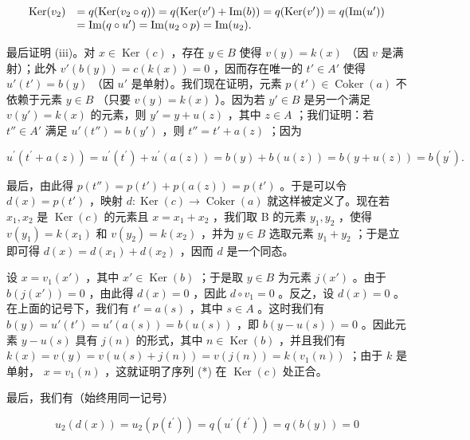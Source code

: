 \[
\begin{array}{r l} \operatorname{Ker} (v _ {2}) & = q (\operatorname{Ker} (v _ {2} \circ q)) = q (\operatorname{Ker} (v ^ {\prime}) + \operatorname{Im} (b)) = q (\operatorname{Ker} (v ^ {\prime})) = q (\operatorname{Im} (u ^ {\prime})) \\ & = \operatorname{Im} (q \circ u ^ {\prime}) = \operatorname{Im} (u _ {2} \circ p) = \operatorname{Im} (u _ {2}). \end{array}
\]

最后证明 (iii)。对 \(x \in \operatorname{Ker}(c)\) ，存在 \(y \in B\) 使得 \(v(y) = k(x)\) （因 \(v\) 是满射）；此外 \(v'(b(y)) = c(k(x)) = 0\) ，因而存在唯一的 \(t' \in A'\) 使得 \(u'(t') = b(y)\) （因 \(u'\) 是单射）。我们现在证明，元素 \(p(t') \in \operatorname{Coker}(a)\) 不依赖于元素 \(y \in B\) （只要 \(v(y) = k(x)\) ）。因为若 \(y' \in B\) 是另一个满足 \(v(y') = k(x)\) 的元素，则 \(y' = y + u(z)\) ，其中 \(z \in A\) ；我们证明：若 \(t'' \in A'\) 满足 \(u'(t'') = b(y')\) ，则 \(t'' = t' + a(z)\) ；因为

\[
u ^ {\prime} \left(t ^ {\prime} + a (z)\right) = u ^ {\prime} \left(t ^ {\prime}\right) + u ^ {\prime} (a (z)) = b (y) + b (u (z)) = b (y + u (z)) = b \left(y ^ {\prime}\right).
\]

最后，由此得 \(p(t'') = p(t') + p(a(z)) = p(t')\) 。于是可以令 \(d(x) = p(t')\) ，映射 \(d: \operatorname{Ker}(c) \to \operatorname{Coker}(a)\) 就这样被定义了。现在若 \(x_1, x_2\) 是 \(\operatorname{Ker}(c)\) 的元素且 \(x = x_1 + x_2\) ，我们取 B 的元素 \(y_1, y_2\) ，使得 \(v(y_1) = k(x_1)\) 和 \(v(y_2) = k(x_2)\) ，并为 \(y \in B\) 选取元素 \(y_1 + y_2\) ；于是立即可得 \(d(x) = d(x_1) + d(x_2)\) ，因而 \(d\) 是一个同态。

设 \(x = v_{1}(x')\) ，其中 \(x' \in \operatorname{Ker}(b)\) ；于是取 \(y \in B\) 为元素 \(j(x')\) 。由于 \(b(j(x')) = 0\) ，由此得 \(d(x) = 0\) ，因此 \(d \circ v_{1} = 0\) 。反之，设 \(d(x) = 0\) 。在上面的记号下，我们有 \(t' = a(s)\) ，其中 \(s \in A\) 。这时我们有 \(b(y) = u'(t') = u'(a(s)) = b(u(s))\) ，即 \(b(y - u(s)) = 0\) 。因此元素 \(y - u(s)\) 具有 \(j(n)\) 的形式，其中 \(n \in \operatorname{Ker}(b)\) ，并且我们有 \(k(x) = v(y) = v(u(s) + j(n)) = v(j(n)) = k(v_1(n))\) ；由于 \(k\) 是单射， \(x = v_1(n)\) ，这就证明了序列 (*) 在 \(\operatorname{Ker}(c)\) 处正合。

最后，我们有（始终用同一记号）

\[
u _ {2} (d (x)) = u _ {2} \left(p \left(t ^ {\prime}\right)\right) = q \left(u ^ {\prime} \left(t ^ {\prime}\right)\right) = q (b (y)) = 0
\]

